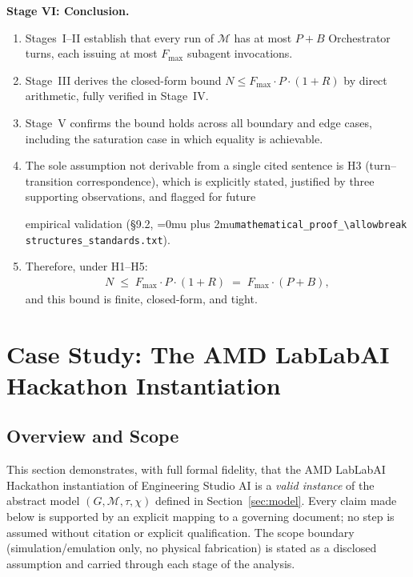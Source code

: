 \documentclass[12pt]{article}
\theoremstyle{definition}
\DeclareRobustCommand{\code}[1]{\begingroup\Urlmuskip=0mu plus 2mu\relax\nolinkurl{#1}\endgroup}
\newcommand{\ProofStd}{\code{mathematical\_proof\_\allowbreak structures\_standards.txt}}
\begin{document}
\medskip
\noindent\textbf{Stage VI: Conclusion.}
\begin{enumerate}
    \item[VI.1] Stages~I--II establish that every run of $\mathcal{M}$
                has at most $P + B$ Orchestrator turns, each issuing at
                most $F_{\max}$ subagent invocations.
    \item[VI.2] Stage~III derives the closed-form bound
                $N \leq F_{\max} \cdot P \cdot (1+R)$ by direct
                arithmetic, fully verified in Stage~IV.
    \item[VI.3] Stage~V confirms the bound holds across all boundary and
                edge cases, including the saturation case in which
                equality is achievable.
    \item[VI.4] The sole assumption not derivable from a single
                cited sentence is H3 (turn--transition correspondence),
                which is explicitly stated, justified by three
                supporting observations, and flagged for future
                \begin{sloppypar}
                empirical validation (\S9.2,
                \ProofStd{}).
                \end{sloppypar}
    \item[VI.5] Therefore, under H1--H5:
                \begin{align}
                    \label{eq:final-bound}
                    N \;\leq\; F_{\max} \cdot P \cdot (1 + R)
                    \;=\; F_{\max} \cdot (P + B),
                \end{align}
                and this bound is finite, closed-form, and tight.
                \qedhere
\end{enumerate}


\section{Case Study: The AMD LabLabAI Hackathon Instantiation}
\label{sec:case-study}

\subsection{Overview and Scope}
\label{sec:case-study-overview}

This section demonstrates, with full formal fidelity, that the AMD
LabLabAI Hackathon instantiation of Engineering Studio AI is a
\emph{valid instance} of the abstract model $(G, \mathcal{M}, \tau,
\chi)$ defined in Section~\ref{sec:model}.  Every claim made below is
supported by an explicit mapping to a governing document; no step is
assumed without citation or explicit qualification.  The scope
boundary (simulation/emulation only, no physical fabrication) is
stated as a disclosed assumption and carried through each stage of the
analysis.
\end{document}
